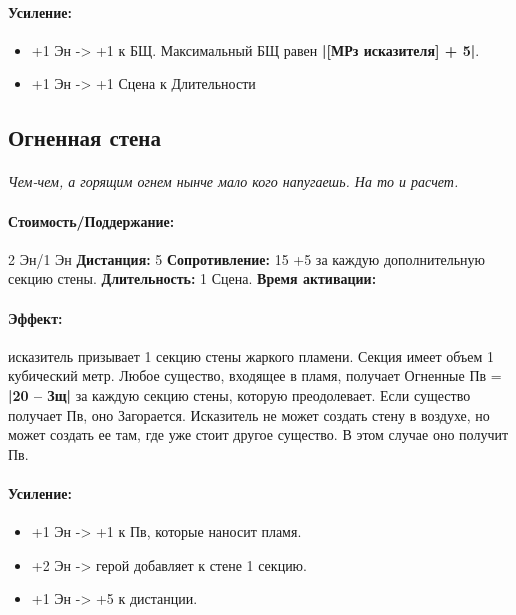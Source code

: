 \begin{itemize}
\begin{itemize}
\paragraph{Усиление:}
\begin{itemize}
\item+1 Эн -> +1 к БЩ. Максимальный БЩ равен 
\textbf{|[МРз исказителя] + 5|}.
\item+1 Эн -> +1 Сцена к Длительности
\end{itemize}
\subsection{Огненная стена}
\paragraph{} 
\textit{
\tbd Чем-чем, а горящим огнем нынче мало кого напугаешь. На то и расчет.}
\paragraph{Стоимость/Поддержание: }2 Эн/1 Эн
\newline
\textbf{Дистанция: }5
\newline
\textbf{Сопротивление: }15 +5 за каждую дополнительную секцию стены.
\newline 
\textbf{Длительность: }1 Сцена.
\newline 
\textbf{Время активации: }
\paragraph{Эффект: }исказитель призывает 1 секцию стены жаркого пламени. Секция имеет объем 1 кубический метр. Любое существо, входящее в пламя, получает Огненные Пв = 
\textbf{|20 – Зщ|} за каждую секцию стены, которую преодолевает. Если существо получает Пв, оно Загорается. Исказитель не может создать стену в воздухе, но может создать ее там, где уже стоит другое существо. В этом случае оно получит Пв.
\paragraph{Усиление:}
\begin{itemize}
\item+1 Эн -> +1 к Пв, которые наносит пламя.
\item+2 Эн -> герой добавляет к стене 1 секцию.
\item+1 Эн -> +5 к дистанции.
\end{itemize}

\end{itemize}
\end{itemize}
